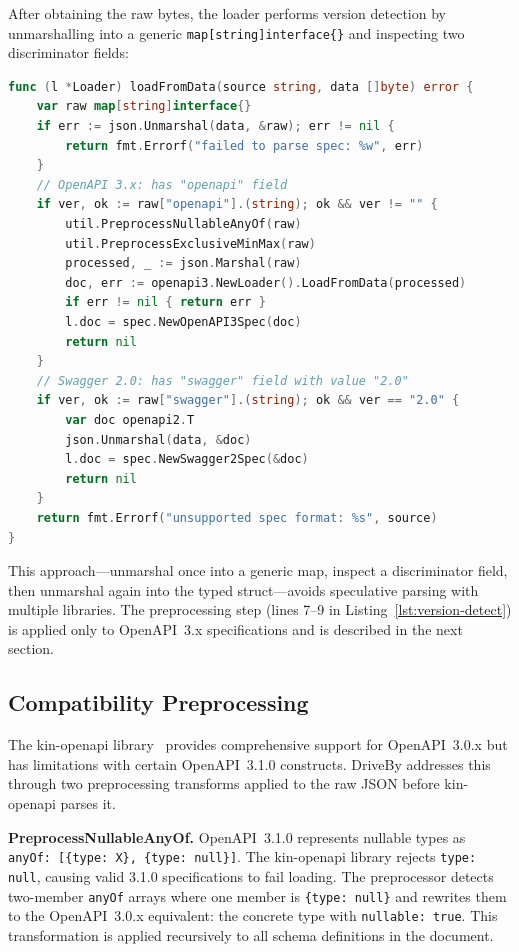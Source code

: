 After obtaining the raw bytes, the loader performs version detection by unmarshalling into a generic \texttt{map[string]interface\{\}} and inspecting two discriminator fields:

\begin{lstlisting}[language=Go,caption={Specification version detection (\texttt{loader/loader.go}).},label={lst:version-detect}]
func (l *Loader) loadFromData(source string, data []byte) error {
    var raw map[string]interface{}
    if err := json.Unmarshal(data, &raw); err != nil {
        return fmt.Errorf("failed to parse spec: %w", err)
    }
    // OpenAPI 3.x: has "openapi" field
    if ver, ok := raw["openapi"].(string); ok && ver != "" {
        util.PreprocessNullableAnyOf(raw)
        util.PreprocessExclusiveMinMax(raw)
        processed, _ := json.Marshal(raw)
        doc, err := openapi3.NewLoader().LoadFromData(processed)
        if err != nil { return err }
        l.doc = spec.NewOpenAPI3Spec(doc)
        return nil
    }
    // Swagger 2.0: has "swagger" field with value "2.0"
    if ver, ok := raw["swagger"].(string); ok && ver == "2.0" {
        var doc openapi2.T
        json.Unmarshal(data, &doc)
        l.doc = spec.NewSwagger2Spec(&doc)
        return nil
    }
    return fmt.Errorf("unsupported spec format: %s", source)
}
\end{lstlisting}

This approach---unmarshal once into a generic map, inspect a discriminator field, then unmarshal again into the typed struct---avoids speculative parsing with multiple libraries. The preprocessing step (lines 7--9 in Listing~\ref{lst:version-detect}) is applied only to OpenAPI~3.x specifications and is described in the next section.

\subsection{Compatibility Preprocessing}
\label{subsec:preprocessing}

The kin-openapi library~\cite{kin-openapi} provides comprehensive support for OpenAPI~3.0.x but has limitations with certain OpenAPI~3.1.0 constructs. DriveBy addresses this through two preprocessing transforms applied to the raw JSON before kin-openapi parses it.

\textbf{PreprocessNullableAnyOf.} OpenAPI~3.1.0 represents nullable types as \texttt{anyOf: [\{type: X\}, \{type: null\}]}. The kin-openapi library rejects \texttt{type: null}, causing valid 3.1.0 specifications to fail loading. The preprocessor detects two-member \texttt{anyOf} arrays where one member is \texttt{\{type: null\}} and rewrites them to the OpenAPI~3.0.x equivalent: the concrete type with \texttt{nullable: true}. This transformation is applied recursively to all schema definitions in the document.


